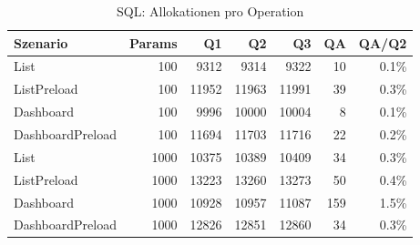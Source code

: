 \begin{table}[ht]
\caption{SQL: Allokationen pro Operation}
\begin{tabular}{lrrrrrr}
\toprule
Szenario & Params & Q1 & Q2 & Q3 & QA & QA/Q2 \\
\midrule
	List & 100 & 9312 & 9314 & 9322 & 10 & 0.1\% \\
	ListPreload & 100 & 11952 & 11963 & 11991 & 39 & 0.3\% \\
	Dashboard & 100 & 9996 & 10000 & 10004 & 8 & 0.1\% \\
	DashboardPreload & 100 & 11694 & 11703 & 11716 & 22 & 0.2\% \\
	List & 1000 & 10375 & 10389 & 10409 & 34 & 0.3\% \\
	ListPreload & 1000 & 13223 & 13260 & 13273 & 50 & 0.4\% \\
	Dashboard & 1000 & 10928 & 10957 & 11087 & 159 & 1.5\% \\
	DashboardPreload & 1000 & 12826 & 12851 & 12860 & 34 & 0.3\% \\
\bottomrule
\end{tabular}
\label{tab:benchmark_sql_allocsperop}
\end{table}
	